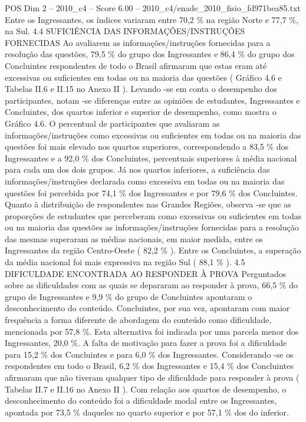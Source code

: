\begin{textsample}{POS Dim 2 – 2010\_c4 – Score 6.00 – 2010\_c4/enade\_2010\_fisio\_fd971bea85.txt}
Entre os Ingressantes, os índices variaram entre 70,2 \% na região Norte e 77,7 \%, na Sul. 4.4 SUFICIÊNCIA DAS INFORMAÇÕES/INSTRUÇÕES FORNECIDAS Ao avaliarem as informações/instruções fornecidas para a resolução das questões, 79,5 \% do grupo dos Ingressantes e 86,4 \% do grupo dos Concluintes respondentes de todo o Brasil afirmaram que estas eram até excessivas ou suficientes em todas ou na maioria das questões ( Gráfico 4.6 e Tabelas II.6 e II.15 no Anexo II ).
Levando -se em conta o desempenho dos participantes, notam -se diferenças entre as opiniões de estudantes, Ingressantes e Concluintes, dos quartos inferior e superior de desempenho, como mostra o Gráfico 4.6.
O percentual de participantes que avaliaram as informações/instruções como excessivas ou suficientes em todas ou na maioria das questões foi mais elevado nos quartos superiores, correspondendo a 83,5 \% dos Ingressantes e a 92,0 \% dos Concluintes, percentuais superiores à média nacional para cada um dos dois grupos.
Já nos quartos inferiores, a suficiência das informações/instruções declarada como excessiva em todas ou na maioria das questões foi percebida por 74,1 \% dos Ingressantes e por 79,6 \% dos Concluintes.
Quanto à distribuição de respondentes nas Grandes Regiões, observa -se que as proporções de estudantes que perceberam como excessivas ou suficientes em todas ou na maioria das questões as informações/instruções fornecidas para a resolução das mesmas superaram as médias nacionais, em maior medida, entre os Ingressantes da região Centro-Oeste ( 82,2 \% ).
Entre os Concluintes, a superação da média nacional foi mais expressiva na região Sul ( 88,1 \% ). 4.5 DIFICULDADE ENCONTRADA AO RESPONDER À PROVA Perguntados sobre as dificuldades com as quais se depararam ao responder à prova, 66,5 \% do grupo de Ingressantes e 9,9 \% do grupo de Concluintes apontaram o desconhecimento do conteúdo.
Concluintes, por sua vez, apontaram com maior frequência a forma diferente de abordagem do conteúdo como dificuldade, mencionada por 57,8 \%.
Esta alternativa foi indicada por uma parcela menor dos Ingressantes, 20,0 \%.
A falta de motivação para fazer a prova foi a dificuldade para 15,2 \% dos Concluintes e para 6,0 \% dos Ingressantes.
Considerando -se os respondentes em todo o Brasil, 6,2 \% dos Ingressantes e 15,4 \% dos Concluintes afirmaram que não tiveram qualquer tipo de dificuldade para responder à prova ( Tabelas II.7 e II.16 no Anexo II ).
Com relação aos quartos de desempenho, o desconhecimento do conteúdo foi a dificuldade modal entre os Ingressantes, apontada por 73,5 \% daqueles no quarto superior e por 57,1 \% dos do inferior.

\end{textsample}
